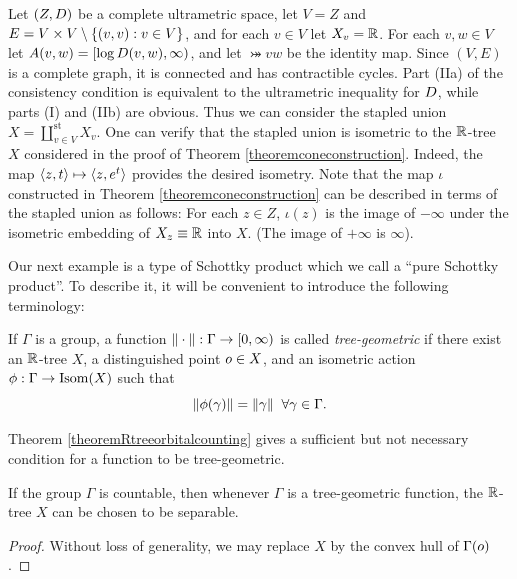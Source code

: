 \begin{example}
\label{exampleconeconstruction}
Let $(Z,D)$ be a complete ultrametric space, let $V = Z$ and $E = V\times V\setminus\{(v,v) : v\in V\}$, and for each $v\in V$ let $X_v = \R$. For each $v,w\in V$ let $A(v,w) = [\log D(v,w),\infty)$, and let $\bij vw$ be the identity map. Since $(V,E)$ is a complete graph, it is connected and has contractible cycles. Part (IIa) of the consistency condition is equivalent to the ultrametric inequality for $D$, while parts (I) and (IIb) are obvious. Thus we can consider the stapled union $X = \coprod_{v\in V}^{\text{st}} X_v$. One can verify that the stapled union is isometric to the $\R$-tree $X$ considered in the proof of Theorem \ref{theoremconeconstruction}. Indeed, the map $\langle z,t\rangle \mapsto \langle z,e^t\rangle$ provides the desired isometry. Note that the map $\iota$ constructed in Theorem \ref{theoremconeconstruction} can be described in terms of the stapled union as follows: For each $z\in Z$, $\iota(z)$ is the image of $-\infty$ under the isometric embedding of $X_z \equiv\R$ into $X$. (The image of $+\infty$ is $\infty$).
\end{example}

Our next example is a type of Schottky product which we call a ``pure Schottky product''. To describe it, it will be convenient to introduce the following terminology:

\begin{definition}
\label{definitiontreegeometric}
If $\Gamma$ is a group, a function $\|\cdot\|:\Gamma\to{[0,\infty)}$ is called \emph{tree-geometric} if there exist an $\R$-tree $X$, a distinguished point $o\in X$, and an isometric action $\phi:\Gamma\to\operatorname{Isom}(X)$ such that
\[
\|\phi(\gamma)\| = \|\gamma\| \;\;\forall \gamma\in\Gamma.
\]
\end{definition}

\begin{example}
Theorem \ref{theoremRtreeorbitalcounting} gives a sufficient but not necessary condition for a function to be tree-geometric.
\end{example}

\begin{remark}
If the group $\Gamma$ is countable, then whenever $\Gamma$ is a tree-geometric function, the $\R$-tree $X$ can be chosen to be separable.
\end{remark}
\begin{proof}
Without loss of generality, we may replace $X$ by the convex hull of $\Gamma(o)$.
\end{proof}


